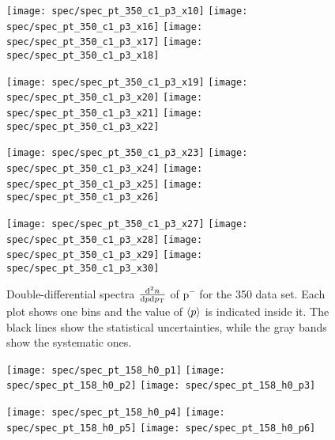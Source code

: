 \begin{figure}[!ht]
  \centering

  \texttt{[image: spec/spec\_pt\_350\_c1\_p3\_x10]}
  \texttt{[image: spec/spec\_pt\_350\_c1\_p3\_x16]}
  \texttt{[image: spec/spec\_pt\_350\_c1\_p3\_x17]}
  \texttt{[image: spec/spec\_pt\_350\_c1\_p3\_x18]}

  \texttt{[image: spec/spec\_pt\_350\_c1\_p3\_x19]}
  \texttt{[image: spec/spec\_pt\_350\_c1\_p3\_x20]}
  \texttt{[image: spec/spec\_pt\_350\_c1\_p3\_x21]}
  \texttt{[image: spec/spec\_pt\_350\_c1\_p3\_x22]}

  \texttt{[image: spec/spec\_pt\_350\_c1\_p3\_x23]}
  \texttt{[image: spec/spec\_pt\_350\_c1\_p3\_x24]}
  \texttt{[image: spec/spec\_pt\_350\_c1\_p3\_x25]}
  \texttt{[image: spec/spec\_pt\_350\_c1\_p3\_x26]}

  \texttt{[image: spec/spec\_pt\_350\_c1\_p3\_x27]}
  \texttt{[image: spec/spec\_pt\_350\_c1\_p3\_x28]}
  \texttt{[image: spec/spec\_pt\_350\_c1\_p3\_x29]}
  \texttt{[image: spec/spec\_pt\_350\_c1\_p3\_x30]}
 
  \caption{Double-differential spectra $\frac{\text{d}^2n}{\text{d}p\text{d}p_\text{T}}$
    of p$^-$ for the 350 \GeVc data set. Each plot shows one \pp bins and the value
    of $\langle p\rangle$ is indicated inside it. The black lines show the statistical
    uncertainties, while the gray bands show the systematic ones.}
  \label{fig:hadron:spec:dedx:all350:c1p3}
\end{figure}

\clearpage

\begin{figure}[!ht]
  \centering

  \texttt{[image: spec/spec\_pt\_158\_h0\_p1]}
  \texttt{[image: spec/spec\_pt\_158\_h0\_p2]}
  \texttt{[image: spec/spec\_pt\_158\_h0\_p3]}

  \texttt{[image: spec/spec\_pt\_158\_h0\_p4]}
  \texttt{[image: spec/spec\_pt\_158\_h0\_p5]}
  \texttt{[image: spec/spec\_pt\_158\_h0\_p6]}

  \caption{}
  \label{fig:hadron:spec:vzero:all158:h0}
\end{figure}


